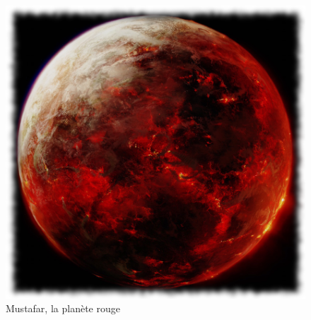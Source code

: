 \documentclass[10pt,a4paper,twoside,twocolumn,openany]{book}
\begin{document}
\vspace{2cm}

\begin{figure}
\hfill\includegraphics[scale=0.4]{mustafar.png}
\caption{Mustafar, la planète rouge}
\end{figure}
\end{document}

